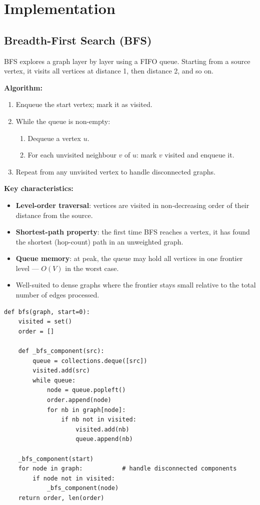 \section{Implementation}

\subsection{Breadth-First Search (BFS)}

BFS explores a graph layer by layer using a FIFO queue. Starting from a source vertex, it visits all vertices at distance 1, then distance 2, and so on.

\textbf{Algorithm:}
\begin{enumerate}
    \item Enqueue the start vertex; mark it as visited.
    \item While the queue is non-empty:
    \begin{enumerate}
        \item Dequeue a vertex $u$.
        \item For each unvisited neighbour $v$ of $u$: mark $v$ visited and enqueue it.
    \end{enumerate}
    \item Repeat from any unvisited vertex to handle disconnected graphs.
\end{enumerate}

\textbf{Key characteristics:}
\begin{itemize}
    \item \textbf{Level-order traversal}: vertices are visited in non-decreasing order of their distance from the source.
    \item \textbf{Shortest-path property}: the first time BFS reaches a vertex, it has found the shortest (hop-count) path in an unweighted graph.
    \item \textbf{Queue memory}: at peak, the queue may hold all vertices in one frontier level — $O(V)$ in the worst case.
    \item Well-suited to dense graphs where the frontier stays small relative to the total number of edges processed.
\end{itemize}

\begin{verbatim}
def bfs(graph, start=0):
    visited = set()
    order = []

    def _bfs_component(src):
        queue = collections.deque([src])
        visited.add(src)
        while queue:
            node = queue.popleft()
            order.append(node)
            for nb in graph[node]:
                if nb not in visited:
                    visited.add(nb)
                    queue.append(nb)

    _bfs_component(start)
    for node in graph:           # handle disconnected components
        if node not in visited:
            _bfs_component(node)
    return order, len(order)
\end{verbatim}

